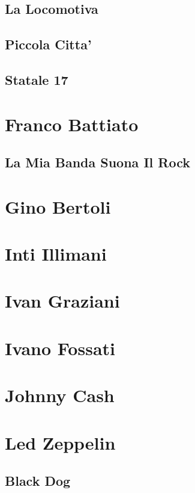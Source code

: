 \section{La Locomotiva}
\section{Piccola Citta'}
\section{Statale 17}

\chapter{Franco Battiato}
\section{La Mia Banda Suona Il Rock}

\chapter{Gino Bertoli}

\chapter{Inti Illimani}

\chapter{Ivan Graziani}

\chapter{Ivano Fossati}

\chapter{Johnny Cash}

\chapter{Led Zeppelin}
\section{Black Dog}
